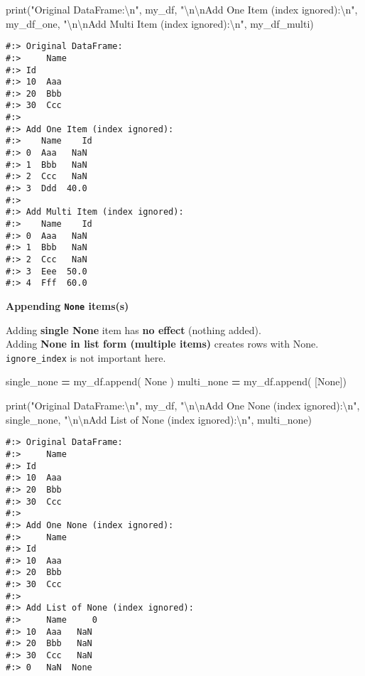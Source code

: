 \documentclass[
]{book}
\newenvironment{Shaded}{\begin{snugshade}}{\end{snugshade}}
\newcommand{\BuiltInTok}[1]{#1}
\newcommand{\CharTok}[1]{\textcolor[rgb]{0.5,0.5,0.5}{#1}}
\newcommand{\NormalTok}[1]{#1}
\newcommand{\OperatorTok}[1]{\textcolor[rgb]{0.43,0.43,0.43}{\textbf{#1}}}
\newcommand{\StringTok}[1]{\textcolor[rgb]{0.5,0.5,0.5}{#1}}
\newcommand{\VariableTok}[1]{\textcolor[rgb]{0,0,0}{#1}}
\begin{document}
\begin{Shaded}
\begin{Highlighting}[]
\BuiltInTok{print}\NormalTok{(}\StringTok{"Original DataFrame:}\CharTok{\textbackslash{}n}\StringTok{"}\NormalTok{, my\_df,}
      \StringTok{"}\CharTok{\textbackslash{}n\textbackslash{}n}\StringTok{Add One Item (index ignored):}\CharTok{\textbackslash{}n}\StringTok{"}\NormalTok{, my\_df\_one,}
      \StringTok{"}\CharTok{\textbackslash{}n\textbackslash{}n}\StringTok{Add Multi Item (index ignored):}\CharTok{\textbackslash{}n}\StringTok{"}\NormalTok{, my\_df\_multi)}
\end{Highlighting}
\end{Shaded}

\begin{verbatim}
#:> Original DataFrame:
#:>     Name
#:> Id     
#:> 10  Aaa
#:> 20  Bbb
#:> 30  Ccc 
#:> 
#:> Add One Item (index ignored):
#:>    Name    Id
#:> 0  Aaa   NaN
#:> 1  Bbb   NaN
#:> 2  Ccc   NaN
#:> 3  Ddd  40.0 
#:> 
#:> Add Multi Item (index ignored):
#:>    Name    Id
#:> 0  Aaa   NaN
#:> 1  Bbb   NaN
#:> 2  Ccc   NaN
#:> 3  Eee  50.0
#:> 4  Fff  60.0
\end{verbatim}

\textbf{Appending \texttt{None} items(s)}

Adding \textbf{single None} item has \textbf{no effect} (nothing added).\\
Adding \textbf{None in list form (multiple items)} creates rows with None.\\
\texttt{ignore\_index} is not important here.

\begin{Shaded}
\begin{Highlighting}[]
\NormalTok{single\_none }\OperatorTok{=}\NormalTok{ my\_df.append( }\VariableTok{None}\NormalTok{  )}
\NormalTok{multi\_none  }\OperatorTok{=}\NormalTok{ my\_df.append( [}\VariableTok{None}\NormalTok{])}

\BuiltInTok{print}\NormalTok{(}\StringTok{"Original DataFrame:}\CharTok{\textbackslash{}n}\StringTok{"}\NormalTok{, my\_df,}
      \StringTok{"}\CharTok{\textbackslash{}n\textbackslash{}n}\StringTok{Add One None (index ignored):}\CharTok{\textbackslash{}n}\StringTok{"}\NormalTok{, single\_none,}
      \StringTok{"}\CharTok{\textbackslash{}n\textbackslash{}n}\StringTok{Add List of None (index ignored):}\CharTok{\textbackslash{}n}\StringTok{"}\NormalTok{, multi\_none)}
\end{Highlighting}
\end{Shaded}

\begin{verbatim}
#:> Original DataFrame:
#:>     Name
#:> Id     
#:> 10  Aaa
#:> 20  Bbb
#:> 30  Ccc 
#:> 
#:> Add One None (index ignored):
#:>     Name
#:> Id     
#:> 10  Aaa
#:> 20  Bbb
#:> 30  Ccc 
#:> 
#:> Add List of None (index ignored):
#:>     Name     0
#:> 10  Aaa   NaN
#:> 20  Bbb   NaN
#:> 30  Ccc   NaN
#:> 0   NaN  None
\end{verbatim}
\end{document}
